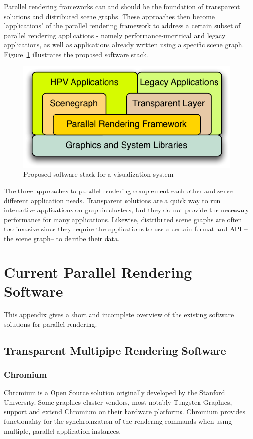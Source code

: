 \documentclass[10pt,a4paper]{scrartcl}
\begin{document}
Parallel rendering frameworks can and should be the foundation of
transparent solutions and distributed scene graphs. These approaches
then become 'applications' of the parallel rendering framework to
address a certain subset of parallel rendering applications - namely
performance-uncritical and legacy applications, as well as applications
already written using a specific scene graph. Figure~\ref{FIG_parallel}
illustrates the proposed software stack.

\begin{figure}[ht]
\centering
\includegraphics[width=0.45\columnwidth]{images/layers.pdf}
\caption{Proposed software stack for a visualization system}
\label{FIG_parallel}
\end{figure}

The three approaches to parallel rendering complement each other and
serve different application needs. Transparent solutions are a quick way
to run interactive applications on graphic clusters, but they do not
provide the necessary performance for many applications. Likewise,
distributed scene graphs are often too invasive since they require the
applications to use a certain format and API --the scene graph-- to
decribe their data. 

\appendix
\section{Current Parallel Rendering Software}
This appendix gives a short and incomplete overview of the existing
software solutions for parallel rendering.

\subsection{Transparent Multipipe Rendering Software}
\subsubsection{Chromium}
Chromium is a Open Source solution originally developed by the
Stanford University. Some graphics cluster vendors, most notably
Tungsten Graphics, support and extend Chromium on their hardware
platforms. Chromium provides functionality for the synchronization
of the rendering commands when using multiple, parallel application
instances.
\end{document}
